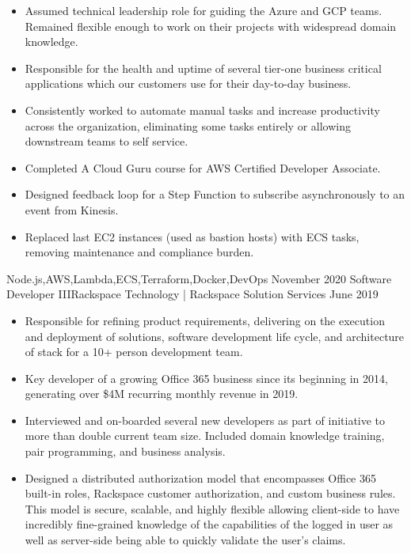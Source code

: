 \begin{experiences}
{\begin{itemize}
                        \item Assumed technical leadership role for guiding the Azure and GCP teams. Remained flexible enough to work on their projects with widespread domain knowledge.
                        \item Responsible for the health and uptime of several tier-one business critical applications which our customers use for their day-to-day business.
                        \item Consistently worked to automate manual tasks and increase productivity across the organization, eliminating some tasks entirely or allowing downstream teams to self service.
                        \ifcv
                        \item Completed A Cloud Guru course for AWS Certified Developer Associate.
                        \item Designed feedback loop for a Step Function to subscribe asynchronously to an event from Kinesis.
                        \item Replaced last EC2 instances (used as bastion hosts) with ECS tasks, removing maintenance and compliance burden.
                        \fi
                      \end{itemize}
                    }
                    {Node.js,AWS,Lambda,ECS,Terraform,Docker,DevOps}
  \emptySeparator
  \experience
    {November 2020} {Software Developer III}{Rackspace Technology | Rackspace Solution Services}
    {June 2019}     {
                      \begin{itemize}
                        \item Responsible for refining product requirements, delivering on the execution and deployment of solutions, software development life cycle, and architecture of stack for a 10+ person development team.
                        \item Key developer of a growing Office 365 business since its beginning in 2014, generating over \$4M recurring monthly revenue in 2019.
                        \item Interviewed and on-boarded several new developers as part of initiative to more than double current team size. Included domain knowledge training, pair programming, and business analysis.
                        \item Designed a distributed authorization model that encompasses Office 365 built-in roles, Rackspace customer authorization, and custom business rules. This model is secure, scalable, and highly flexible allowing client-side to have incredibly fine-grained knowledge of the capabilities of the logged in user as well as server-side being able to quickly validate the user's claims.

\end{itemize}}
\end{experiences}
